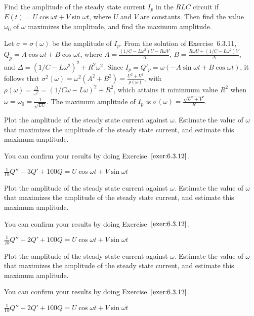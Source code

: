 \documentclass{ximera}
\begin{document}
\begin{problem}

Find the amplitude of the steady state current $I_p$ in the $RLC$
circuit if $E(t)=U\cos\omega
t+V\sin\omega t$, where $U$ and $V$ are constants. Then find the value
$\omega_0$ of $\omega$ maximizes the amplitude, and
 find the maximum amplitude.

 \begin{solution}
     Let $\sigma=\sigma(\omega)$ be the amplitude of $I_p$.
From the solution of  Exercise~6.3.11,
$Q_p=A\cos\omega t+B\cos\omega t$, where
$A=\frac{(1/C-L\omega^2)U-R\omega V}{\Delta}$,
$B=\frac{R\omega U+(1/C-L\omega^2)V}{\Delta}$,  and
$\Delta=(1/C-L\omega^2)^2+R^2\omega^2$. Since
$I_p=Q'_p=\omega(-A\sin\omega t+B\cos\omega t)$, it follows that
$\sigma^2(\omega)=\omega^2(A^2+B^2)=\frac{U^2+V^2}{\rho(\omega)}$,
with
$\rho(\omega)=\frac{\Delta}{\omega^2}=(1/C\omega-L\omega)^2+R^2$,
which attains it mininmum value $R^2$ when
$\omega=\omega_0=\frac{1}{\sqrt{LC}}$. The maximum amplitude of
$I_p$ is
$\sigma(\omega)=\frac{\sqrt{U^2+V^2}}{ R}$.
 \end{solution}
\end{problem}

\begin{problem}\label{exer:6.3.13} Plot the
amplitude of the steady state current against $\omega$. Estimate the
value of $\omega$ that maximizes the amplitude of the steady state
current, and estimate this maximum amplitude. 
\begin{hint}
    You can confirm
your results by doing Exercise~$\ref{exer:6.3.12}$.
\end{hint}
$\frac{1}{10}Q''+3Q'+100Q=U\cos\omega t+V\sin\omega t$
\end{problem}

\begin{problem}\label{exer:6.3.14} Plot the
amplitude of the steady state current against $\omega$. Estimate the
value of $\omega$ that maximizes the amplitude of the steady state
current, and estimate this maximum amplitude. 
\begin{hint}
    You can confirm
your results by doing Exercise~$\ref{exer:6.3.12}$.
\end{hint}
$\frac{1}{20}Q''+2Q'+100Q=U\cos\omega t+V\sin\omega t$
\end{problem}

\begin{problem}\label{exer:6.3.15} Plot the
amplitude of the steady state current against $\omega$. Estimate the
value of $\omega$ that maximizes the amplitude of the steady state
current, and estimate this maximum amplitude. 
\begin{hint}
    You can confirm
your results by doing Exercise~$\ref{exer:6.3.12}$.
\end{hint}
$\frac{1}{10}Q''+2Q'+100Q=U\cos\omega t+V\sin\omega t$
\end{problem}
\end{document}
